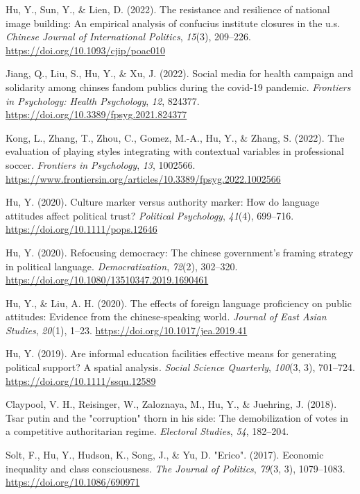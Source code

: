 \documentclass[
  12pt,
]
{article}
\newlength{\cslhangindent}
\newenvironment{CSLReferences}[2] %
 {\begin{list}{}{%
  \setlength{\itemindent}{0pt}
  \setlength{\leftmargin}{0pt}
  \setlength{\parsep}{0pt}
  \ifodd #1
   \setlength{\leftmargin}{\cslhangindent}
   \setlength{\itemindent}{-1\cslhangindent}
  \fi
  \setlength{\itemsep}{#2\baselineskip}}}
 {\end{list}}
\begin{document}
\begin{CSLReferences}{1}{0}
Hu, Y., Sun, Y., \& Lien, D. (2022). The resistance and resilience of
national image building: An empirical analysis of confucius institute
closures in the u.s. \emph{Chinese Journal of International Politics},
\emph{15}(3), 209--226. \url{https://doi.org/10.1093/cjip/poac010}

Jiang, Q., Liu, S., Hu, Y., \& Xu, J. (2022). Social media for health
campaign and solidarity among chinses fandom publics during the covid-19
pandemic. \emph{Frontiers in Psychology: Health Psychology}, \emph{12},
824377. \url{https://doi.org/10.3389/fpsyg.2021.824377}

Kong, L., Zhang, T., Zhou, C., Gomez, M.-A., Hu, Y., \& Zhang, S.
(2022). The evaluation of playing styles integrating with contextual
variables in professional soccer. \emph{Frontiers in Psychology},
\emph{13}, 1002566.
\url{https://www.frontiersin.org/articles/10.3389/fpsyg.2022.1002566}

Hu, Y. (2020). Culture marker versus authority marker: How do language
attitudes affect political trust? \emph{Political Psychology},
\emph{41}(4), 699--716. \url{https://doi.org/10.1111/pops.12646}

Hu, Y. (2020). Refocusing democracy: The chinese government's framing
strategy in political language. \emph{Democratization}, \emph{72}(2),
302--320. \url{https://doi.org/10.1080/13510347.2019.1690461}

Hu, Y., \& Liu, A. H. (2020). The effects of foreign language
proficiency on public attitudes: Evidence from the chinese-speaking
world. \emph{Journal of East Asian Studies}, \emph{20}(1), 1--23.
\url{https://doi.org/10.1017/jea.2019.41}

Hu, Y. (2019). Are informal education facilities effective means for
generating political support? A spatial analysis. \emph{Social Science
Quarterly}, \emph{100}(3, 3), 701--724.
\url{https://doi.org/10.1111/ssqu.12589}

Claypool, V. H., Reisinger, W., Zaloznaya, M., Hu, Y., \& Juehring, J.
(2018). Tsar putin and the "corruption" thorn in his side: The
demobilization of votes in a competitive authoritarian regime.
\emph{Electoral Studies}, \emph{54}, 182--204.

Solt, F., Hu, Y., Hudson, K., Song, J., \& Yu, D. "Erico". (2017).
Economic inequality and class consciousness. \emph{The Journal of
Politics}, \emph{79}(3, 3), 1079--1083.
\url{https://doi.org/10.1086/690971}


\end{CSLReferences}
\end{document}
